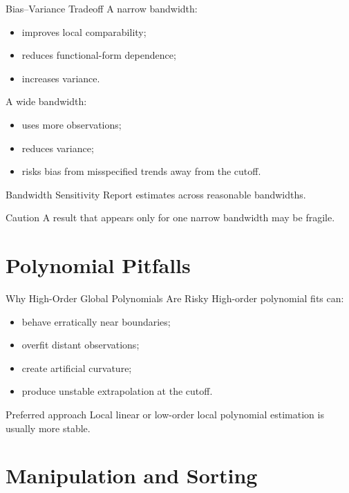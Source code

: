 \documentclass[aspectratio=169,11pt]{beamer}
\begin{document}
\begin{frame}{Bias--Variance Tradeoff}
A narrow bandwidth:
\begin{itemize}
\item improves local comparability;
\item reduces functional-form dependence;
\item increases variance.
\end{itemize}

A wide bandwidth:
\begin{itemize}
\item uses more observations;
\item reduces variance;
\item risks bias from misspecified trends away from the cutoff.
\end{itemize}
\end{frame}

\begin{frame}{Bandwidth Sensitivity}
Report estimates across reasonable bandwidths.

\begin{alertblock}{Caution}
A result that appears only for one narrow bandwidth may be fragile.
\end{alertblock}
\end{frame}

\section{Polynomial Pitfalls}

\begin{frame}{Why High-Order Global Polynomials Are Risky}
High-order polynomial fits can:
\begin{itemize}
\item behave erratically near boundaries;
\item overfit distant observations;
\item create artificial curvature;
\item produce unstable extrapolation at the cutoff.
\end{itemize}

\begin{block}{Preferred approach}
Local linear or low-order local polynomial estimation is usually more stable.
\end{block}
\end{frame}

\section{Manipulation and Sorting}
\end{document}
